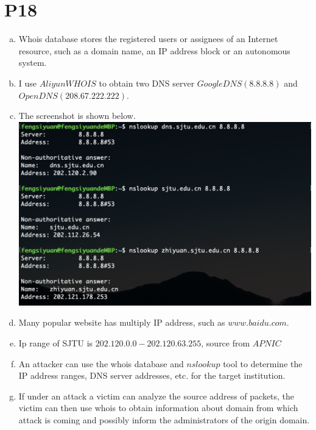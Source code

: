 \documentclass[a4paper, 11pt]{article}
\begin{document}
\section*{P18}
\begin{enumerate}[a.]
	\item Whois database stores the registered users or assignees of an Internet resource, such as a domain name, an IP address block or an autonomous system.
	\item I use $Aliyun WHOIS$ to obtain two DNS server $GoogleDNS(8.8.8.8)$ and $OpenDNS(208.67.222.222)$.
	\item The screenshot is shown below. \newline \includegraphics[width=\linewidth]{figure}
	\item Many popular website has multiply IP address, such as $www.baidu.com$.
	\item Ip range of SJTU is $202.120.0.0 - 202.120.63.255$, source from $APNIC$
 	\item An attacker can use the whois database and $nslookup$ tool to determine the IP address ranges, DNS server addresses, etc. for the target institution.
	\item If under an attack a victim can analyze the source address of packets, the victim can then use whois to obtain information about domain from which attack is coming and
possibly inform the administrators of the origin domain.
\end{enumerate}
\end{document}
